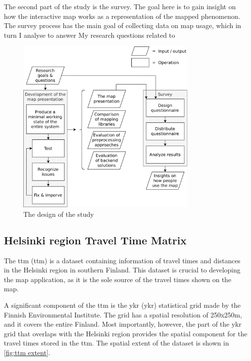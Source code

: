 The second part of the study is the survey.
The goal here is to gain insight on
how the interactive map works as a representation of the mapped phenomenon.
The survey process has the main goal of collecting data on map usage,
which in turn I analyse to answer My research questions related to


\begin{figure}[H]
	\centering
	\includegraphics[width=0.8\textwidth]{visual/figures/diagrams/study_design.png}
	\caption{The design of the study}
	\label{fig:study design}
\end{figure}

\subsection{Helsinki region Travel Time Matrix}

The \acrlong{ttm} (\acrshort{ttm}) \parencite{fin2023}
is a dataset containing information of travel times and distances
in the Helsinki region in southern Finland.
This dataset is crucial to developing the map application,
as it is the sole source of the travel times shown on the map.

A significant component of the \acrshort{ttm} is the \acrlong{ykr} (\acrshort{ykr})
statistical grid made by the Finnish Environmental Institute.
The grid has a spatial resolution of 250x250m, and it covers the entire Finland.
Most importantly, however, the part of the \acrshort{ykr} grid that overlaps with
the Helsinki region provides the spatial component for
the travel times stored in the \acrshort{ttm}.
The spatial extent of the dataset is shown in \ref{fig:ttm extent}.

